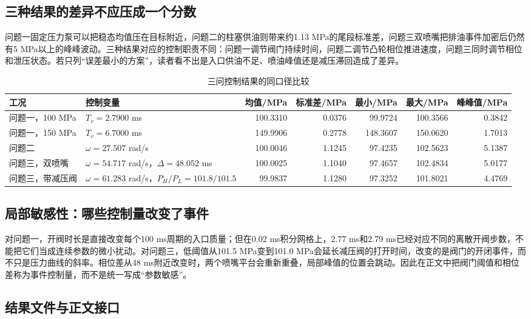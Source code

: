 \documentclass[UTF8,11pt,a4paper]{ctexart}
\begin{document}
\subsection{三种结果的差异不应压成一个分数}

问题一固定压力泵可以把稳态均值压在目标附近，问题二的柱塞供油则带来约1.13 MPa的尾段标准差，问题三双喷嘴把排油事件加密后仍然有5 MPa以上的峰峰波动。三种结果对应的控制职责不同：问题一调节阀门持续时间，问题二调节凸轮相位推进速度，问题三同时调节相位和泄压状态。若只列“误差最小的方案”，读者看不出是入口供油不足、喷油峰值还是减压滞回造成了差异。

\begin{table}[H]
\centering
\caption{三问控制结果的同口径比较}
\label{tab:all-results-a}
\small
\begin{tabularx}{\textwidth}{p{2.4cm}Xrrrrr}
\toprule
工况 & 控制变量 & 均值/MPa & 标准差/MPa & 最小/MPa & 最大/MPa & 峰峰值/MPa\\
\midrule
问题一，100 MPa & $T_v=2.7900$ ms & 100.3310 & 0.0376 & 99.9724 & 100.3566 & 0.3842\\
问题一，150 MPa & $T_v=6.7000$ ms & 149.9906 & 0.2778 & 148.3607 & 150.0620 & 1.7013\\
问题二 & $\omega=27.507$ rad/s & 100.0046 & 1.1245 & 97.4235 & 102.5623 & 5.1387\\
问题三，双喷嘴 & $\omega=54.717$ rad/s，$\Delta=48.052$ ms & 100.0025 & 1.1040 & 97.4657 & 102.4834 & 5.0177\\
问题三，带减压阀 & $\omega=61.283$ rad/s，$P_H/P_L=101.8/101.5$ & 99.9837 & 1.1280 & 97.3252 & 101.8021 & 4.4769\\
\bottomrule
\end{tabularx}
\end{table}

\subsection{局部敏感性：哪些控制量改变了事件}

对问题一，开阀时长是直接改变每个100 ms周期的入口质量；但在0.02 ms积分网格上，2.77 ms和2.79 ms已经对应不同的离散开阀步数，不能把它们当成连续参数的微小扰动。对问题三，低阈值从101.5 MPa变到101.0 MPa会延长减压阀的打开时间，改变的是阀门的开闭事件，而不只是压力曲线的斜率。相位差从48 ms附近改变时，两个喷嘴平台会重新重叠，局部峰值的位置会跳动。因此在正文中把阀门阈值和相位差称为事件控制量，而不是统一写成“参数敏感”。

\subsection{结果文件与正文接口}
\end{document}
